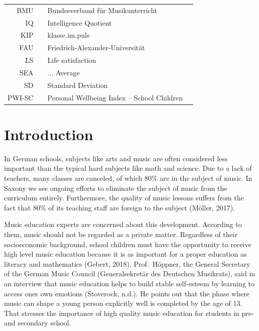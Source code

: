 \documentclass[a4, 12pt]{article}
\begin{document}
\begin{tabular}{rp{0.2cm}lp{1cm}}
    BMU     & &  Bundesverband für Musikunterricht   \\
    IQ     & &  Intelligence Quotient  \\
    KIP    & &  klasse.im.puls  \\
    FAU     & &  Friedrich-Alexander-Universität  \\
    LS     & &  Life satisfaction  \\
    SEA     & &  ... Average  \\
    SD     & &  Standard Deviation  \\
    PWI-SC     & &  Personal Wellbeing Index -- School Children  \\
\end{tabular}

\clearpage
\listoftables

\clearpage
\listoffigures

\clearpage
\pagestyle{plain}

\hypertarget{introduction}{%
\section{Introduction}\label{introduction}}

\label{introduction}

In German schools, subjects like arts and music are often considered less important than the typical hard subjects like math and science. Due to a lack of teachers, many classes are canceled, of which 80\% are in the subject of music. In Saxony we see ongoing efforts to eliminate the subject of music from the curriculum entirely. Furthermore, the quality of music lessons suffers from the fact that 80\% of its teaching staff are foreign to the subject (Möller, 2017).

Music education experts are concerned about this development. According to them, music should not be regarded as a private matter. Regardless of their socioeconomic background, school children must have the opportunity to receive high level music education because it is as important for a proper education as literacy and mathematics (Gebert, 2018). Prof.~Höppner, the General Secretary of the German Music Council (Generalsekretär des Deutschen Musikrats), said in an interview that music education helps to build stable self-esteem by learning to access ones own emotions (Stoverock, n.d.). He points out that the phase where music can shape a young person explicitly well is completed by the age of 13. That stresses the importance of high quality music education for students in pre- and secondary school.
\end{document}

